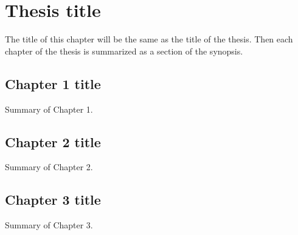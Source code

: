 \chapter{Thesis title}\label{ch:title}
 The title of this chapter will be the same as the title of the thesis.
 Then each chapter of the thesis is summarized as a section of the synopsis.

\section{Chapter 1 title}\label{sec:c1}
 Summary of Chapter 1.

\section{Chapter 2 title}\label{sec:c2}
 Summary of Chapter 2.

\section{Chapter 3 title}\label{sec:c3}
 Summary of Chapter 3.



